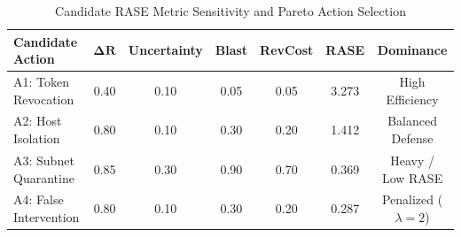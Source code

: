\begin{table}[t]
\centering
\small
\caption{Candidate RASE Metric Sensitivity and Pareto Action Selection}
\label{tab:rase_sensitivity}
\begin{tabular}{lcccccc}
\toprule
\textbf{Candidate Action} & $\mathbf{\Delta R}$ & \textbf{Uncertainty} & \textbf{Blast} & \textbf{RevCost} & \textbf{RASE} & \textbf{Dominance} \\
\midrule
A1: Token Revocation & 0.40 & 0.10 & 0.05 & 0.05 & 3.273 & High Efficiency \\
A2: Host Isolation & 0.80 & 0.10 & 0.30 & 0.20 & 1.412 & Balanced Defense \\
A3: Subnet Quarantine & 0.85 & 0.30 & 0.90 & 0.70 & 0.369 & Heavy / Low RASE \\
A4: False Intervention & 0.80 & 0.10 & 0.30 & 0.20 & 0.287 & Penalized ($\lambda=2$) \\
\bottomrule
\end{tabular}
\end{table}